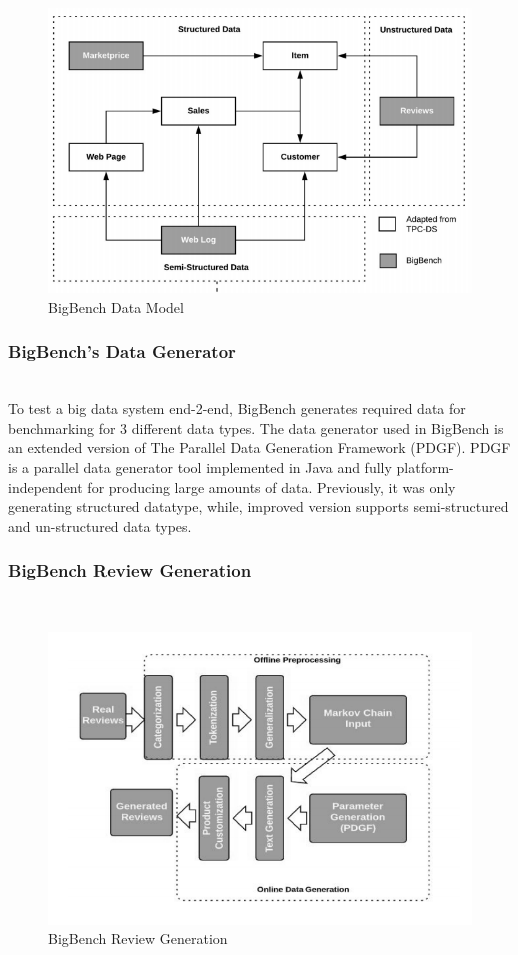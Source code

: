 \documentclass[sigconf,10pt]{acmart}
\begin{document}
\begin{figure}[h!]
  \includegraphics[width=\linewidth]{bb_datamodel.png}
  \caption{BigBench Data Model}
  \label{fig:boat1}
\end{figure}

\subsubsection{BigBench’s Data Generator} \hfill\\
\newline 
To test a big data system end-2-end, BigBench generates required data for benchmarking for 3 different data types. The data generator used in BigBench is an extended version of The Parallel Data Generation Framework (PDGF)\cite{pdgf}. PDGF is a parallel data generator tool implemented in Java and fully platform-independent for producing large amounts of data. Previously, it was only generating structured datatype, while, improved version supports semi-structured and un-structured data types.

\subsubsection{BigBench Review Generation} \hfill\\      

\begin{figure}[h!]
  \includegraphics[width=\linewidth]{bb_reviewgen.png}
  \caption{BigBench Review Generation}
  \label{fig:boat1}
\end{figure}
\end{document}
